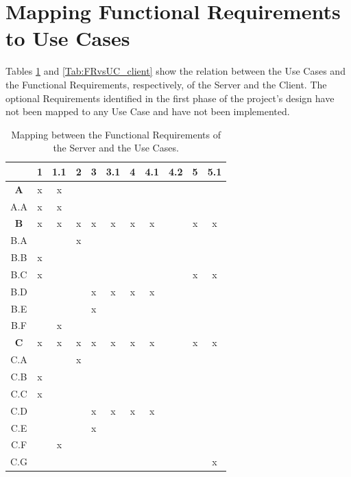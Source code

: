 \documentclass[finalReport.tex]{subfiles}
\begin{document}
\clearpage



\clearpage
\section{Mapping Functional Requirements to Use Cases}\label{sec:mapping}

Tables \ref{Tab:FRvsUC_server} and \ref{Tab:FRvsUC_client} show the relation between the Use Cases and the Functional Requirements, respectively, of the Server and the Client. The optional Requirements identified in the first phase of the project's design have not been mapped to any Use Case and have not been implemented.

\begin{table}[h]\centering
\begin{tabular}{|c|c|c|c|c|c|c|c|c|c|c|}
\hline 
 & \textbf{1} & 1.1 & \textbf{2} & \textbf{3} & 3.1 & \textbf{4} & 4.1 & 4.2 & \textbf{5} & 5.1 \\ 
\hline 
\textbf{A} & x & x &  &  &  &  &  &  &  &  \\ 
\hline 
A.A & x & x &  &  &  &  &  &  &  &  \\ 
\hline 
\textbf{B} & x & x & x & x & x & x & x &  & x & x \\ 
\hline 
B.A &  &  & x &  &  &  &  &  &  &  \\ 
\hline 
B.B & x &  &  &  &  &  &  &  &  &  \\ 
\hline 
B.C & x &  &  &  &  &  &  &  & x & x \\ 
\hline 
B.D &  &  &  & x & x & x & x &  &  &  \\ 
\hline 
B.E &  &  &  & x &  &  &  &  &  &  \\ 
\hline 
B.F &  & x &  &  &  &  &  &  &  &  \\ 
\hline 
\textbf{C} & x & x & x & x & x & x & x &  & x & x \\ 
\hline 
C.A &  &  & x &  &  &  &  &  &  &  \\ 
\hline 
C.B & x &  &  &  &  &  &  &  &  &  \\ 
\hline 
C.C & x &  &  &  &  &  &  &  &  &  \\ 
\hline 
C.D &  &  &  & x & x & x & x &  &  &  \\ 
\hline 
C.E &  &  &  & x &  &  &  &  &  &  \\ 
\hline 
C.F &  & x &  &  &  &  &  &  &  &  \\ 
\hline 
C.G &  &  &  &  &  &  &  &  &  & x \\ 
\hline 
\end{tabular} 
\caption{Mapping between the Functional Requirements of the Server and the Use Cases.}\label{Tab:FRvsUC_server}
\end{table}
\end{document}

